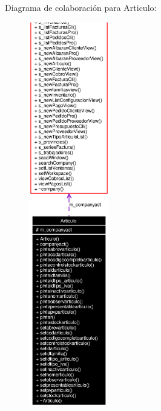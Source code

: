 Diagrama de colaboraci\'{o}n para Articulo:\begin{figure}[H]
\begin{center}
\leavevmode
\includegraphics[width=99pt]{classArticulo__coll__graph}
\end{center}
\end{figure}

